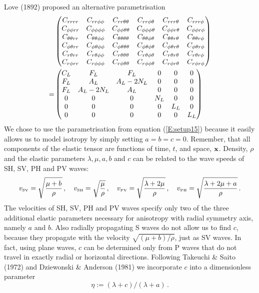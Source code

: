 Love (1892) proposed an alternative parametrisation
\begin{align}\label{E:setup15b}
&\begin{pmatrix}
C_{r r r r} & C_{r r \phi \phi} & C_{r r \theta \theta} & C_{r r \phi \theta} & C_{r r r \theta} & C_{r r r \phi} \\
C_{\phi \phi r r} & C_{\phi \phi \phi \phi} & C_{\phi \phi \theta \theta} & C_{\phi \phi \phi \theta} & C_{\phi \phi r \theta} & C_{\phi \phi r \phi} \\
C_{\theta \theta r r} & C_{\theta \theta \phi \phi} & C_{\theta \theta \theta \theta} & C_{\theta \theta \phi \theta} & C_{\theta \theta r \theta} & C_{\theta \theta r \phi} \\
C_{\phi \theta r r} & C_{\phi \theta \phi \phi} & C_{\phi \theta \theta \theta} & C_{\phi \theta \phi \theta} & C_{\phi \theta r \theta} & C_{\phi \theta r \phi} \\
C_{r \theta r r} & C_{r \theta \phi \phi} & C_{r \theta \theta \theta} & C_{r \theta \phi \theta} & C_{r \theta r \theta} & C_{r \theta r \phi} \\
C_{r \phi r r} & C_{r \phi \phi \phi} & C_{r \phi \theta \theta} &
C_{r \phi \phi \theta} & C_{r \phi r \theta} & C_{r \phi r \phi}
\end{pmatrix}\notag\\
=&
\begin{pmatrix}
C_L & F_L & F_L & 0 & 0 & 0 \\
F_L & A_L & A_L-2N_L & 0 & 0 & 0 \\
F_L & A_L-2N_L & A_L & 0 & 0 & 0 \\
0 & 0 & 0 & N_L & 0 & 0 \\
0 & 0 & 0 & 0 & L_L & 0 \\
0 & 0 & 0 & 0 & 0 & L_L
\end{pmatrix}
\end{align}
We chose to use the parametrisation from equation (\ref{E:setup15})
because it easily allows us to model isotropy by simply setting
$a=b=c=0$. Remember, that all components of the elastic tensor are
functions of time, $t$, and space, $\mathbf{x}$. Density, $\rho$ and the
elastic parameters $\lambda, \mu, a, b$ and $c$ can be related to
the wave speeds of SH, SV, PH and PV waves:
\begin{equation}\label{E:svsh17}
v_\text{\tiny{SV}}=\sqrt{\frac{\mu+b}{\rho}}\,,\quad
v_\text{\tiny{SH}}=\sqrt{\frac{\mu}{\rho}}\,,\quad
v_\text{\tiny{PV}}=\sqrt{\frac{\lambda+2\mu}{\rho}}\,,\quad
v_\text{\tiny{PH}}=\sqrt{\frac{\lambda+2\mu+a}{\rho}}\,.
\end{equation}
The velocities of SH, SV, PH and PV waves specify only two of the
three additional elastic parameters necessary for anisotropy with
radial symmetry axis, namely $a$ and $b$. Also radially propagating
S waves do not allow us to find $c$, because they propagate with the
velocity $\sqrt{(\mu+b)/\rho}$, just as SV waves. In fact, using
plane waves, $c$ can be determined only from P waves that do not
travel in exactly radial or horizontal directions. Following
Takeuchi \& Saito (1972) and Dziewonski \& Anderson (1981) we
incorporate $c$ into a dimensionless parameter
\begin{equation}\label{E:pvph007}
\eta:=(\lambda+c)/(\lambda+a)\,.
\end{equation}
